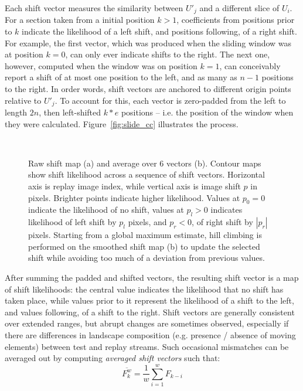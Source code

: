 \documentclass[twocolumn, 9pt,fleqn]{jsproceedings}
\begin{document}
Each shift vector measures the similarity between $U'_j$ and a different slice of $U_i$. For a section taken from a initial position $k > 1$, coefficients from positions prior to $k$ indicate the likelihood of a left shift, and positions following, of a right shift. For example, the first vector, which was produced when the sliding window was at position $k = 0$, can only ever indicate shifts to the right. The next one, however, computed when the window was on position $k = 1$, can conceivably report a shift of at most one position to the left, and as many as $n-1$ positions to the right. In order words, shift vectors are anchored to different origin points relative to $U'_j$. To account for this, each vector is zero-padded from the left to length $2n$, then left-shifted $k*e$ positions -- i.e. the position of the window when they were calculated. Figure~\ref{fig:slide_cc} illustrates the process.

\begin{figure}[h!]
\\
\caption{Raw shift map (a) and average over 6 vectors (b). Contour maps show shift likelihood across a sequence of shift vectors. Horizontal axis is replay image index, while vertical axis is image shift $p$ in pixels. Brighter points indicate higher likelihood. Values at $p_0 = 0$ indicate the likelihood of no shift, values at $p_l > 0$ indicates likelihood of left shift by $p_l$ pixels, and $p_r < 0$, of right shift by $|p_r|$ pixels. Starting from a global maximum estimate, hill climbing is performed on the smoothed shift map (b) to update the selected shift while avoiding too much of a deviation from previous values.}
\label{fig:selection}
\end{figure}

After summing the padded and shifted vectors, the resulting shift vector is a map of shift likelihoods: the central value indicates the likelihood that no shift has taken place, while values prior to it represent the likelihood of a shift to the left, and values following, of a shift to the right. Shift vectors are generally consistent over extended ranges, but abrupt changes are sometimes observed, especially if there are differences in landscape composition (e.g. presence / absence of moving elements) between test and replay streams. Such occasional mismatches can be averaged out by computing \textit{averaged shift vectors} such that:
\begin{equation}
\overline{F^w_k} = \frac{1}{w} \sum_{i=1}^{w}{F_{k-i}}
\end{equation}
\end{document}
